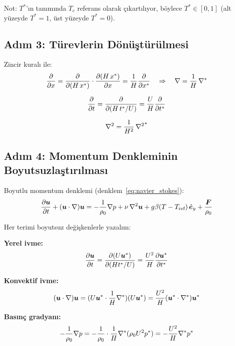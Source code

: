 Not: $T^*$'ın tanımında $T_c$ referans olarak çıkartılıyor, böylece $T^* \in [0, 1]$ (alt yüzeyde $T^* = 1$, üst yüzeyde $T^* = 0$).

\subsection{Adım 3: Türevlerin Dönüştürülmesi}

Zincir kuralı ile:
\begin{equation}
    \frac{\partial }{\partial x} = \frac{\partial }{\partial (H\,x^*)}\cdot\frac{\partial (H\,x^*)}{\partial x} = \frac{1}{H}\frac{\partial }{\partial x^*}
    \quad \Rightarrow \quad
    \nabla = \frac{1}{H}\,\nabla^*
    \label{eq:grad_transform}
\end{equation}

\begin{equation}
    \frac{\partial }{\partial t} = \frac{\partial }{\partial (H\,t^*/U)} = \frac{U}{H}\frac{\partial }{\partial t^*}
    \label{eq:time_transform}
\end{equation}

\begin{equation}
    \nabla^2 = \frac{1}{H^2}\,{\nabla^2}^*
    \label{eq:laplacian_transform}
\end{equation}

\subsection{Adım 4: Momentum Denkleminin Boyutsuzlaştırılması}

Boyutlu momentum denklemi (denklem~\ref{eq:navier_stokes}):
\begin{equation}
    \frac{\partial \bm{u}}{\partial t} + (\bm{u}\cdot\nabla)\bm{u} = -\frac{1}{\rho_0}\nabla p + \nu\,\nabla^2\bm{u} + g\beta(T - T_{\text{ref}})\,\hat{\bm{e}}_y + \frac{\bm{F}}{\rho_0}
\end{equation}

Her terimi boyutsuz değişkenlerle yazalım:

\textbf{Yerel ivme:}
\begin{equation}
    \frac{\partial \bm{u}}{\partial t} = \frac{\partial (U\bm{u}^*)}{\partial (H t^*/U)} = \frac{U^2}{H}\frac{\partial \bm{u}^*}{\partial t^*}
\end{equation}

\textbf{Konvektif ivme:}
\begin{equation}
    (\bm{u}\cdot\nabla)\bm{u} = (U\bm{u}^*\cdot\frac{1}{H}\nabla^*)(U\bm{u}^*) = \frac{U^2}{H}(\bm{u}^*\cdot\nabla^*)\bm{u}^*
\end{equation}

\textbf{Basınç gradyanı:}
\begin{equation}
    -\frac{1}{\rho_0}\nabla p = -\frac{1}{\rho_0}\cdot\frac{1}{H}\nabla^*(\rho_0 U^2 p^*) = -\frac{U^2}{H}\nabla^* p^*
\end{equation}

